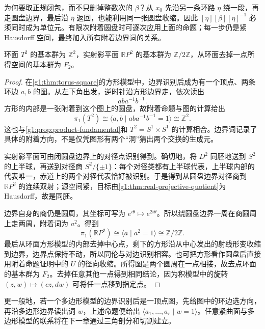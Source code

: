 为何要取正规闭包，而不只删掉整数次的 \(\beta\)？从 \(x_0\) 先沿另一条环路 \(\eta\) 绕一段，再走圆盘边界，最后沿 \(\bar\eta\) 返回，也能利用同一张圆盘收缩。因此 \([\eta][\beta][\eta]^{-1}\) 必须同时成为单位元。有限次附着圆盘时可逐次应用上面的命题；每一步仍是紧 Hausdorff 空间，最终加入所有附着边界词的关系。

\begin{example}\label{g1:exm:surface-presentations}
	环面 \(T^2\) 的基本群为 \(\mathbb Z^2\)，实射影平面 \(\mathbb RP^2\) 的基本群为 \(\mathbb Z/2\mathbb Z\)，从环面去掉一点所得空间的基本群为 \(F_2\)。
\end{example}
\begin{proof}
	在\cref{g1:thm:torus-square}的方形模型中，边界识别后成为有一个顶点、两条环边 \(a,b\) 的图。从左下角出发，逆时针沿方形边界走，依次读出
	\[
		aba^{-1}b^{-1}.
	\]
	方形的内部是一张附着到这个图上的圆盘，故附着命题与图的计算给出
	\[
		\pi_1(T^2)\cong\langle a,b\mid aba^{-1}b^{-1}=1\rangle\cong\mathbb Z^2.
	\]
	这也与\cref{g1:prop:product-fundamental}和 \(T^2=S^1\times S^1\) 的计算相合。边界词记录了具体的附着方向，不是仅凭图形有两个“洞”猜出两个交换的生成元。

	实射影平面可由闭圆盘边界上的对径点识别得到。确切地，将 \(D^2\) 同胚地送到 \(S^2\) 的上半球，再送到对径商 \(S^2/\{\pm1\}\)：每个对径类都有上半球代表，上半球内部的代表唯一，赤道上的两个对径代表恰好被识别。于是得到从圆盘边界对径商到 \(\mathbb RP^2\) 的连续双射；源空间紧，目标由\cref{g1:thm:real-projective-quotient}为 Hausdorff，故是同胚。

	边界自身的商仍是圆周，其坐标可写为 \(e^{i\theta}\mapsto e^{2i\theta}\)。所以绕圆盘边界一周在商圆周上走两周，附着词为 \(a^2\)。得到
	\[
		\pi_1(\mathbb RP^2)\cong\langle a\mid a^2=1\rangle\cong\mathbb Z/2\mathbb Z.
	\]
	最后从环面方形模型的内部去掉中心点，剩下的方形沿从中心发出的射线形变收缩到边界，边界点保持不动，所以同伦与对边识别相容。也可把方形看作圆盘后直接用附着命题证明中的 \(U\) 的径向收缩。所得图是两个圆周在一点相接，故去点环面的基本群为 \(F_2\)。去掉任意其他一点得到相同结论，因为积模型中的旋转 \((z,w)\mapsto(cz,dw)\) 可将任一点移到指定点。
\end{proof}

更一般地，若一个多边形模型的边界识别后是一顶点图，先给图中的环边选方向，再沿多边形边界读出词 \(w\)，上述命题便给出 \(\langle a_1,\ldots,a_r\mid w=1\rangle\)。任意紧曲面与多边形模型的联系将在下一章通过三角剖分和切割建立。

